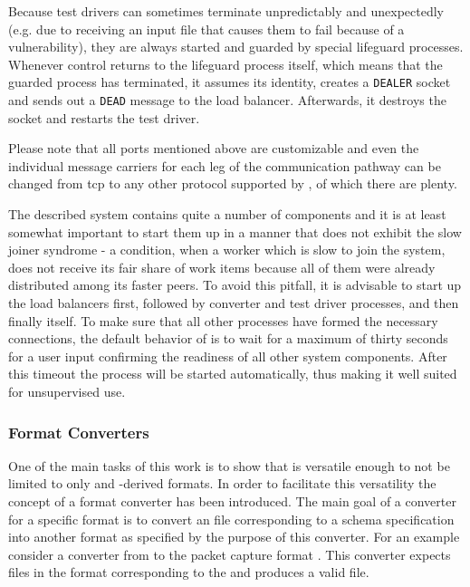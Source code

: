 Because test drivers can sometimes terminate unpredictably and unexpectedly (e.g. due to receiving an input
file that causes them to fail because of a vulnerability), they are always started and guarded by special
lifeguard processes. Whenever control returns to the lifeguard process itself, which means that the guarded
process has terminated, it assumes its identity, creates a \texttt{DEALER} socket and sends out a \texttt{DEAD}
message to the load balancer. Afterwards, it destroys the socket and restarts the test driver.

Please note that all ports mentioned above are customizable and even the individual message carriers for
each leg of the communication pathway can be changed from tcp to any other protocol supported by \zmq, of which
there are plenty.

The described system contains quite a number of components and it is at least somewhat important to start them
up in a manner that does not exhibit the slow joiner syndrome - a condition, when a worker which is slow to
join the system, does not receive its fair share of work items because all of them were already distributed
among its faster peers. To avoid this pitfall, it is advisable to start up the load balancers first, followed
by converter and test driver processes, and then finally \xmlmate itself. To make sure that all other
processes have formed the necessary connections, the default behavior of \xmlmate is to wait for a maximum of
thirty seconds for a user input confirming the readiness of all other system components. After this timeout the
process will be started automatically, thus making it well suited for unsupervised use.

\subsubsection{Format Converters}
One of the main tasks of this work is to show that \xmlmate is versatile enough to not be limited to 
only \xml and \xml-derived formats. In order to facilitate this versatility the concept of a format 
converter has been introduced. The main goal of a converter for a specific format is to convert an 
\xml file corresponding to a schema specification into another format as specified by the purpose 
of this converter. For an example consider a converter from \xml to the packet capture format \pcap. 
This converter expects \xml files in the format corresponding to the \pcap{} \xsd and produces a 
valid \pcap file. 


